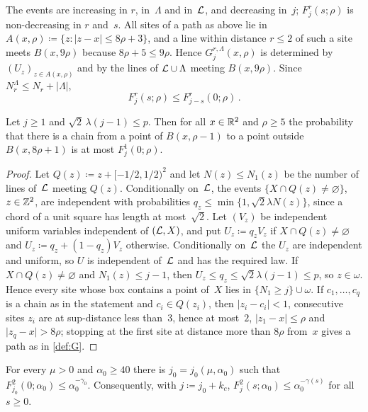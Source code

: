 \documentclass[11pt,letterpaper]{article}
\begin{document}
The events are increasing in $r$, in~$\Lambda$ and in~$\mathcal L$, and decreasing in~$j$; $F_j^r(s;\rho)$ is non-decreasing in $r$ and~$s$. All sites of a path as above lie in $A(x,\rho)\coloneqq\{z\colon\lvert z-x\rvert\le8\rho+3\}$, and a line within distance $r\le2$ of such a site meets $B(x,9\rho)$ because $8\rho+5\le9\rho$. Hence $G_j^{r,\Lambda}(x,\rho)$ is determined by $(U_z)_{z\in A(x,\rho)}$ and by the lines of $\mathcal L\cup\Lambda$ meeting $B(x,9\rho)$. Since $N_r^\Lambda\le N_r+\lvert\Lambda\rvert$,
\begin{equation}
\label{eq:trivial}
  F_j^r(s;\rho)\le F^r_{j-s}(0;\rho)\,.
\end{equation}

\begin{lemma}[Domination]
\label{lem:domination}
Let $j\ge1$ and $\sqrt2\,\lambda(j-1)\le p$. Then for all $x\in\mathbb R^2$ and $\rho\ge5$ the probability that there is a chain from a point of $B(x,\rho-1)$ to a point outside $B(x,8\rho+1)$ is at most $F_j^1(0;\rho)$.
\end{lemma}

\begin{proof}
Let $Q(z)\coloneqq z+[-1/2,1/2)^2$ and let $N(z)\le N_1(z)$ be the number of lines of~$\mathcal L$ meeting $Q(z)$. Conditionally on~$\mathcal L$, the events $\{X\cap Q(z)\neq\varnothing\}$, $z\in\mathbb Z^2$, are independent with probabilities $q_z\le\min\{1,\sqrt2\lambda N(z)\}$, since a chord of a unit square has length at most~$\sqrt2$. Let $(V_z)$ be independent uniform variables independent of $(\mathcal L,X)$, and put $U_z\coloneqq q_zV_z$ if $X\cap Q(z)\neq\varnothing$ and $U_z\coloneqq q_z+(1-q_z)V_z$ otherwise. Conditionally on~$\mathcal L$ the $U_z$ are independent and uniform, so $U$ is independent of~$\mathcal L$ and has the required law. If $X\cap Q(z)\neq\varnothing$ and $N_1(z)\le j-1$, then $U_z\le q_z\le\sqrt2\lambda(j-1)\le p$, so $z\in\omega$. Hence every site whose box contains a point of~$X$ lies in $\{N_1\ge j\}\cup\omega$. If $c_1,\dots,c_q$ is a chain as in the statement and $c_i\in Q(z_i)$, then $\lvert z_i-c_i\rvert<1$, consecutive sites $z_i$ are at sup-distance less than~$3$, hence at most~$2$, $\lvert z_1-x\rvert\le\rho$ and $\lvert z_q-x\rvert>8\rho$; stopping at the first site at distance more than $8\rho$ from~$x$ gives a path as in \cref{def:G}.
\end{proof}

\begin{lemma}
\label{lem:base}
For every $\mu>0$ and $\alpha_0\ge40$ there is $j_0=j_0(\mu,\alpha_0)$ such that $F^2_{j_0}(0;\alpha_0)\le\alpha_0^{-\gamma_0}$. Consequently, with $j\coloneqq j_0+k_c$, $F^2_j(s;\alpha_0)\le\alpha_0^{-\gamma(s)}$ for all $s\ge0$.
\end{lemma}
\end{document}
